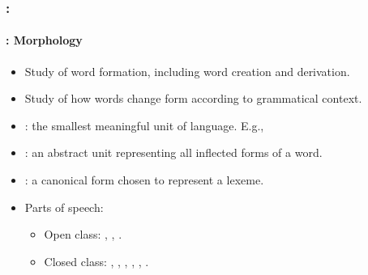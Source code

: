 \documentclass[xcolor=table]{beamer}
\begin{document}
\begin{frame}
	\frametitle{\insertshortsubtitle: \insertsection}
	\framesubtitle{\insertsubsection: Morphology}
	
	\begin{itemize}
		\item Study of word formation, including word creation and derivation.
		\item Study of how words change form according to grammatical context.
		\item {}: the smallest meaningful unit of language. 
		E.g., 
		\item {}: an abstract unit representing all inflected forms of a word.
		\item {}: a canonical form chosen to represent a lexeme.
		\item Parts of speech:
		\begin{itemize}
			\item Open class: , , .
			\item Closed class: , , , , , .
		\end{itemize}
	\end{itemize}

\end{frame}
\end{document}
